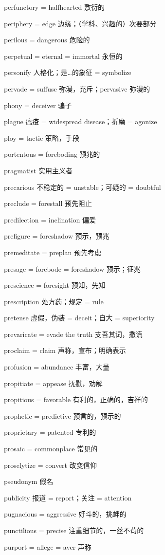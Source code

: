 \documentclass[UTF8, fontset = none, zihao = -4, linespread = 1.1]{ctexart}
\begin{document}
\begin{multicols}{2}
perfunctory = halfhearted 敷衍的

periphery = edge 边缘；（学科、兴趣的）次要部分

perilous = dangerous 危险的

perpetual = eternal = immortal 永恒的

personify 人格化；是…的象征 = symbolize

pervade = suffuse 弥漫，充斥；pervasive 弥漫的

phony = deceiver 骗子

plague 瘟疫 = widespread disease；折磨 = agonize

ploy = tactic 策略，手段

portentous = foreboding 预兆的

pragmatist 实用主义者

precarious 不稳定的 = unstable；可疑的 = doubtful

preclude = forestall 预先阻止

predilection = inclination 偏爱

prefigure = foreshadow 预示，预兆

premeditate = preplan 预先考虑

presage = forebode = foreshadow 预示；征兆

prescience = foresight 预知，先知

prescription 处方药；规定 = rule

pretense 虚假，伪装 = deceit；自大 = superiority

prevaricate = evade the truth 支吾其词，撒谎

proclaim = claim 声称，宣布；明确表示

profusion = abundance 丰富，大量

propitiate = appease 抚慰，劝解

propitious = favorable 有利的，正确的，吉祥的

prophetic = predictive 预言的，预示的

proprietary = patented 专利的

prosaic = commonplace 常见的

proselytize = convert 改变信仰

pseudonym 假名

publicity 报道 = report；关注 = attention

pugnacious = aggressive 好斗的，挑衅的

punctilious = precise 注重细节的，一丝不苟的

purport = allege = aver 声称


\end{multicols}
\end{document}
